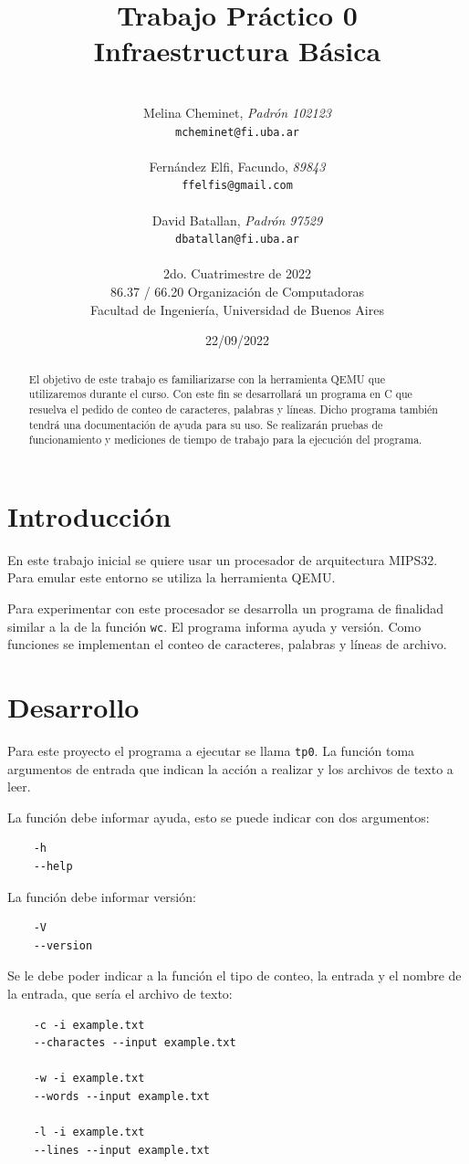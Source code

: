 \documentclass[a4paper, 10pt, twoside, notitlepage]{article}
\title{\textbf{Trabajo Práctico 0\\Infraestructura Básica} \\}
\author{ \\
         Melina Cheminet, \textit{Padrón 102123} \\
          \texttt{ mcheminet@fi.uba.ar }       \\
		  [2.5ex]
        \\
        Fernández Elfi, Facundo, \textit{89843} \\  \texttt{ffelfis@gmail.com}\\ 
		  [2.5ex]
		 \\
        David Batallan, \textit{Padrón 97529}     \\
          \texttt{dbatallan@fi.uba.ar}                      \\ 
		  [2.5ex]
		 \\
         \normalsize{2do. Cuatrimestre de 2022}            \\
         \normalsize{86.37 / 66.20 Organización de Computadoras} \\
         \normalsize{Facultad de Ingeniería, Universidad de Buenos Aires} 
       }
\date{22/09/2022}
\begin{document}
	
\maketitle
	
\begin{abstract}
El objetivo de este trabajo es familiarizarse con la herramienta QEMU que utilizaremos durante el curso. Con este fin se desarrollará un programa en C que resuelva el pedido de conteo de caracteres, palabras y líneas. Dicho programa también tendrá una documentación de ayuda para su uso. Se realizarán pruebas de funcionamiento y mediciones de tiempo de trabajo para la ejecución del programa.
\end{abstract}

\tableofcontents
\newpage



\section{Introducción}

En este trabajo inicial se quiere usar un procesador de arquitectura MIPS32. Para emular este entorno se utiliza la herramienta QEMU.

Para experimentar con este procesador se desarrolla un programa de finalidad similar a la de la función \texttt{wc}. El programa informa ayuda y versión. Como funciones se implementan el conteo de caracteres, palabras y líneas de archivo.

\section{Desarrollo}
Para este proyecto el programa a ejecutar se llama \texttt{tp0}. La función toma argumentos de entrada que indican la acción a realizar y los archivos de texto a leer.

La función debe informar ayuda, esto se puede indicar con dos argumentos:
\begin{verbatim}
    -h
    --help
\end{verbatim}

La función debe informar versión:
\begin{verbatim}
    -V
    --version
\end{verbatim}

Se le debe poder indicar a la función el tipo de conteo, la entrada y el nombre de la entrada, que sería el archivo de texto:
\begin{verbatim}
    -c -i example.txt
    --charactes --input example.txt
    
    -w -i example.txt
    --words --input example.txt
    
    -l -i example.txt
    --lines --input example.txt
\end{verbatim}
\end{document}
